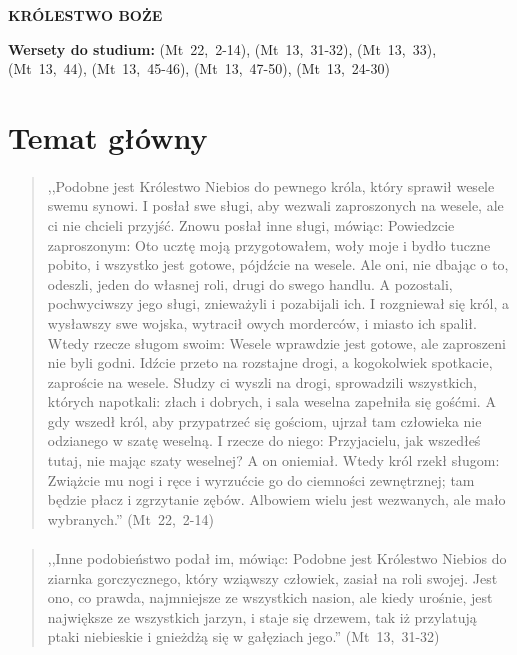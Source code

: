 \documentclass[10pt,a4paper,oneside]{article}
\begin{document}
\centerline{\textbf{\MakeUppercase{Królestwo Boże}}}
\begin{center}
\textbf{Wersety do studium:} \mbox{(Mt 22, 2-14)}, \mbox{(Mt 13, 31-32)}, \mbox{(Mt 13, 33)}, \mbox{(Mt 13, 44)}, \mbox{(Mt 13, 45-46)}, \mbox{(Mt 13, 47-50)}, \mbox{(Mt 13, 24-30)}
\end{center}
\section{Temat główny}
\paragraph{}
\begin{quote}
,,Podobne jest Królestwo Niebios do pewnego króla, który sprawił wesele swemu synowi. I posłał swe sługi, aby wezwali zaproszonych na wesele, ale ci nie chcieli przyjść. Znowu posłał inne sługi, mówiąc: Powiedzcie zaproszonym: Oto ucztę moją przygotowałem, woły moje i bydło tuczne pobito, i wszystko jest gotowe, pójdźcie na wesele. Ale oni, nie dbając o to, odeszli, jeden do własnej roli, drugi do swego handlu. A pozostali, pochwyciwszy jego sługi, znieważyli i pozabijali ich. I rozgniewał się król, a wysławszy swe wojska, wytracił owych morderców, i miasto ich spalił. Wtedy rzecze sługom swoim: Wesele wprawdzie jest gotowe, ale zaproszeni nie byli godni. Idźcie przeto na rozstajne drogi, a kogokolwiek spotkacie, zaproście na wesele. Słudzy ci wyszli na drogi, sprowadzili wszystkich, których napotkali: złach i dobrych, i sala weselna zapełniła się gośćmi. A gdy wszedł król, aby przypatrzeć się gościom, ujrzał tam człowieka nie odzianego w szatę weselną. I rzecze do niego: Przyjacielu, jak wszedłeś tutaj, nie mając szaty weselnej? A on oniemiał. Wtedy król rzekł sługom: Zwiążcie mu nogi i ręce i wyrzućcie go do ciemności zewnętrznej; tam będzie płacz i zgrzytanie zębów. Albowiem wielu jest wezwanych, ale mało wybranych.'' \mbox{(Mt 22, 2-14)}
\end{quote}
\paragraph{}
\begin{quote}
,,Inne podobieństwo podał im, mówiąc: Podobne jest Królestwo Niebios do ziarnka gorczycznego, który wziąwszy człowiek, zasiał na roli swojej. Jest ono, co prawda, najmniejsze ze wszystkich nasion, ale kiedy urośnie, jest największe ze wszystkich jarzyn, i staje się drzewem, tak iż przylatują ptaki niebieskie i gnieżdżą się w gałęziach jego.'' \mbox{(Mt 13, 31-32)}
\end{quote}
\end{document}
